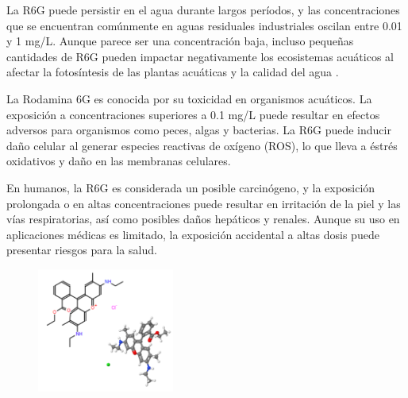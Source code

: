 \documentclass[12pt]{article}
\begin{document}
La R6G puede persistir en el agua durante largos períodos, y las concentraciones que se encuentran comúnmente en aguas residuales industriales oscilan entre 0.01 y 1 mg/L. Aunque parece ser una concentración baja, incluso pequeñas cantidades de R6G pueden impactar negativamente los ecosistemas acuáticos al afectar la fotosíntesis de las plantas acuáticas y la calidad del agua \cite{IEEEreferencias:Ref11}.\vspace{1em} %

La Rodamina 6G es conocida por su toxicidad en organismos acuáticos. La exposición a concentraciones superiores a 0.1 mg/L puede resultar en efectos adversos para organismos como peces, algas y bacterias. La R6G puede inducir daño celular al generar especies reactivas de oxígeno (ROS), lo que lleva a \'{e}str\'es oxidativos y daño en las membranas celulares.\vspace{1em} %

En humanos, la R6G es considerada un posible carcin\'ogeno, y la exposición prolongada o en altas concentraciones puede resultar en irritaci\'on de la piel y las v\'ias respiratorias, así como posibles daños hep\'aticos y renales. Aunque su uso en aplicaciones m\'edicas es limitado, la exposición accidental a altas dosis puede presentar riesgos para la salud.\vspace{1em} %

\begin{figure}[H]
    	   \begin{center}
     	  	\includegraphics[width = 0.4\textwidth]{Imagenes/R6G_MOLECULAS.png}
    	   \end{center} 
        \end{figure}
\end{document}

